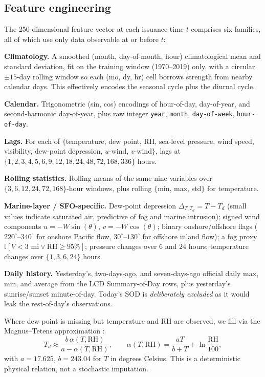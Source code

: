 \documentclass[11pt]{article}
\begin{document}
\subsection{Feature engineering}

The 250-dimensional feature vector at each issuance time $t$ comprises
six families, all of which use only data observable at or before $t$:

\textbf{Climatology.} A smoothed (month, day-of-month, hour) climatological
mean and standard deviation, fit on the training window (1970--2019) only,
with a circular $\pm 15$-day rolling window so each (mo, dy, hr) cell
borrows strength from nearby calendar days. This effectively encodes the
seasonal cycle plus the diurnal cycle.

\textbf{Calendar.} Trigonometric (sin, cos) encodings of hour-of-day,
day-of-year, and second-harmonic day-of-year, plus raw integer
\texttt{year}, \texttt{month}, \texttt{day-of-week}, \texttt{hour-of-day}.

\textbf{Lags.} For each of $\{$temperature, dew point, RH, sea-level pressure,
wind speed, visibility, dew-point depression, $u$-wind, $v$-wind$\}$, lags
at $\{1, 2, 3, 4, 5, 6, 9, 12, 18, 24, 48, 72, 168, 336\}$ hours.

\textbf{Rolling statistics.} Rolling means of the same nine variables over
$\{3, 6, 12, 24, 72, 168\}$-hour windows, plus rolling
$\{$min, max, std$\}$ for temperature.

\textbf{Marine-layer / SFO-specific.} Dew-point depression
$\Delta_{T,T_d} = T - T_d$ (small values indicate saturated air, predictive
of fog and marine intrusion); signed wind components
$u = -W \sin(\theta)$, $v = -W \cos(\theta)$; binary onshore/offshore
flags ($220^\circ$--$340^\circ$ for onshore Pacific flow,
$30^\circ$--$130^\circ$ for offshore inland flow); a fog proxy
$\mathbb{I}[V<3 \text{ mi} \lor \text{RH} \ge 95\%]$; pressure changes over
$6$ and $24$ hours; temperature changes over $\{1, 3, 6, 24\}$ hours.

\textbf{Daily history.} Yesterday's, two-days-ago, and seven-days-ago
official daily max, min, and average from the LCD Summary-of-Day rows,
plus yesterday's sunrise/sunset minute-of-day. Today's SOD is
\emph{deliberately excluded} as it would leak the rest-of-day's
observations.

Where dew point is missing but temperature and RH are observed, we fill via
the Magnus--Tetens approximation \citep{magnus1844magnus,alduchov1996improved}:
\[
T_d \approx \frac{b\, \alpha(T, \mathrm{RH})}{a - \alpha(T, \mathrm{RH})}, \qquad
\alpha(T, \mathrm{RH}) = \frac{a T}{b + T} + \ln \frac{\mathrm{RH}}{100},
\]
with $a = 17.625$, $b = 243.04$ for $T$ in degrees Celsius. This is a
deterministic physical relation, not a stochastic imputation.
\end{document}
